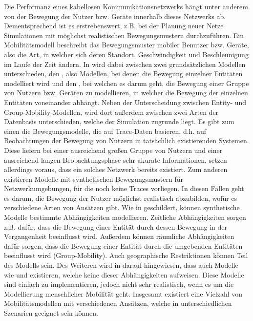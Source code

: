 \documentclass[12pt, a4paper]{article}
\begin{document}
Die Performanz eines kabellosen Kommunikationsnetzwerks hängt unter anderem von der Bewegung 
der Nutzer bzw. Geräte innerhalb dieses Netzwerks ab. Dementsprechend ist es erstrebenswert,
z.B. bei der Planung neuer Netze Simulationen mit möglichst realistischen Bewegungsmustern durchzuführen.
Ein Mobilitätsmodell beschreibt das Bewegungsmuster mobiler Benutzer bzw. Geräte,
also die Art, in welcher sich deren Standort, Geschwindigkeit und Beschleunigung im Laufe der Zeit ändern. \cite{Camp2002}
In \cite{Camp2002} wird dabei zwischen zwei grundsätzlichen Modellen unterschieden, den ,
also Modellen, bei denen die Bewegung einzelner Entitäten modelliert wird und den ,
bei welchen es darum geht, die Bewegung einer Gruppe von Nutzern bzw. Geräten zu modellieren,
in welcher die Bewegung der einzelnen Entitäten voneinander abhängt.
Neben der Unterscheidung zwischen Entity- und Group-Mobility-Modellen, wird dort außerdem zwischen zwei Arten der Datenbasis unterschieden,
welche der Simulation zugrunde liegt. Es gibt zum einen die Bewegungsmodelle, die auf Trace-Daten basieren, d.h. auf Beobachtungen
der Bewegung von Nutzern in tatsächlich existierenden Systemen. Diese liefern bei einer ausreichend großen Gruppe von Nutzern
und einer ausreichend langen Beobachtungsphase sehr akurate Informationen, setzen allerdings voraus, dass ein solches Netzwerk
bereits existiert. \cite{Camp2002} Zum anderen existieren Modelle mit synthetischen Bewegungsmustern für Netzwerkumgebungen, 
für die noch keine Traces vorliegen. In diesen Fällen geht es darum, die Bewegung der Nutzer möglichst realistisch abzubilden,
wofür es verschiedene Arten von Ansätzen gibt.\newline
Wie in \cite{Aschenbruck2011} geschildert, können synthetische Modelle bestimmte Abhängigkeiten modellieren.
Zeitliche Abhängigkeiten sorgen z.B. dafür, dass die Bewegung einer Entität durch dessen Bewegung in der Vergangenheit
beeinflusst wird. Außerdem können räumliche Abhängigkeiten dafür sorgen, dass die Bewegung einer Entität durch die umgebenden 
Entitäten beeinflusst wird (Group-Mobility). Auch geographische Restriktionen können Teil des Modells sein.
Des Weiteren wird in \cite{Aschenbruck2011} darauf hingewiesen, dass auch Modelle wie
 und  existieren, welche keine dieser Abhängigkeiten
aufweisen. Diese Modelle sind einfach zu implementieren, jedoch nicht sehr realistisch, wenn es um die Modellierung
menschlicher Mobilität geht. Insgesamt existiert eine Vielzahl von Mobilitätsmodellen mit verschiedenen Ansätzen, 
welche in unterschiedlichen Szenarien geeignet sein können.
\end{document}
